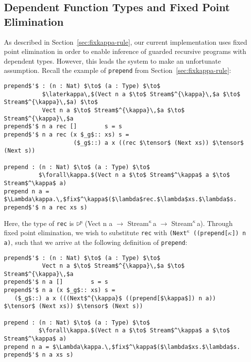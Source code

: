 


\subsection{Dependent Function Types and Fixed Point Elimination}
\label{sec:depend-funct-types}
As described in Section~\ref{sec:fixkappa-rule}, our current implementation uses
fixed point elimination in order to enable inference of guarded recursive
programs with dependent types. However, this leads the system to make an
unfortunate assumption. Recall the example of \texttt{prepend} from
Section~\ref{sec:fixkappa-rule}:
\begin{lstlisting}[mathescape, title=\ttBlock]
prepend$'$ : (n : Nat) $\to$ (a : Type) $\to$
           $\laterkappa\,$(Vect n a $\to$ Stream$^{\kappa}\,$a $\to$ Stream$^{\kappa}\,$a) $\to$ 
           Vect n a $\to$ Stream$^{\kappa}\,$a $\to$ Stream$^{\kappa}\,$a
prepend$'$ n a rec []        s = s 
prepend$'$ n a rec (x $_g$:: xs) s = 
                    ($_g$::) a x ((rec $\tensor$ (Next xs)) $\tensor$ (Next s))

prepend : (n : Nat) $\to$ (a : Type) $\to$ 
          $\forall\kappa.$(Vect n a $\to$ Stream$^\kappa$ a $\to$ Stream$^\kappa$ a)
prepend n a = $\Lambda\kappa.\,$fix$^\kappa$($\lambda$rec.$\lambda$xs.$\lambda$s. prepend$'$ n a rec xs s)
\end{lstlisting}
Here, the type of \texttt{rec} is {$\rhd^{\!\!\kappa}\,$(Vect n a $\to$
  Stream$^{\kappa}\,$a $\to$ Stream$^{\kappa}\,$a)}. Through fixed point
elimination, we wish to substitute \texttt{rec} with \texttt{{(Next$^{\kappa}$
    ((prepend[$\kappa$]) n a)}}, such that we arrive at the following definition
of \texttt{prepend}:
\begin{lstlisting}[mathescape, title=\ttBlock]
prepend$'$ : (n : Nat) $\to$ (a : Type) $\to$
           Vect n a $\to$ Stream$^{\kappa}\,$a $\to$ Stream$^{\kappa}\,$a
prepend$'$ n a []        s = s 
prepend$'$ n a (x $_g$:: xs) s = 
   ($_g$::) a x (((Next$^{\kappa}$ ((prepend[$\kappa$]) n a)) $\tensor$ (Next xs)) $\tensor$ (Next s))

prepend : (n : Nat) $\to$ (a : Type) $\to$ 
          $\forall\kappa.$(Vect n a $\to$ Stream$^\kappa$ a $\to$ Stream$^\kappa$ a)
prepend n a = $\Lambda\kappa.\,$fix$^\kappa$($\lambda$xs.$\lambda$s. prepend$'$ n a xs s)
\end{lstlisting}
